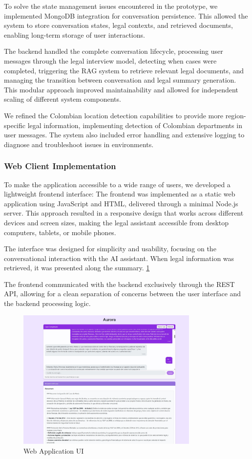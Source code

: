 To solve the state management issues encountered in the prototype, we implemented MongoDB integration for conversation persistence. This allowed the system to store 
conversation states, legal contexts, and retrieved documents, enabling long-term storage of user interactions.

The backend handled the complete conversation lifecycle, processing user messages through the legal interview model, 
detecting when cases were completed, triggering the RAG system to retrieve relevant legal documents, and managing the transition 
between conversation and legal summary generation. This modular approach improved maintainability and allowed for independent scaling of different system components.

We refined the Colombian location detection capabilities to provide more region-specific legal information, implementing detection of Colombian departments in user messages. 
The system also included error handling and extensive logging to diagnose and troubleshoot issues in environments.

\subsubsection{Web Client Implementation}

To make the application accessible to a wide range of users, we developed a lightweight frontend interface:
The frontend was implemented as a static web application using JavaScript and HTML, delivered through a minimal Node.js server. This approach resulted in a responsive 
design that works across different devices and screen sizes, making the legal assistant accessible from desktop computers, tablets, or mobile phones.

The interface was designed for simplicity and usability, focusing on the conversational interaction with the AI assistant. 
When legal information was retrieved, it was presented along the summary. \ref{fig:Frontend}

The frontend communicated with the backend exclusively through the REST API, allowing for a clean separation of concerns between 
the user interface and the backend processing logic.

\begin{figure}[htbp]
    \centering
    \includegraphics[width=0.8\textwidth]{figures/Frontend.jpeg}
    \caption{Web Application UI}
    \label{fig:Frontend}
\end{figure}

